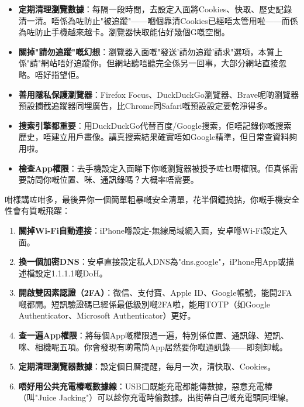 \begin{itemize}
  \item \textbf{定期清理瀏覽數據}：每隔一段時間，去設定入面將Cookies、快取、歷史記錄清一清。唔係為咗防止"被追蹤"——嗰個靠清Cookies已經唔太管用啦——而係為咗防止手機越來越卡。瀏覽器快取能佔好幾個G嘅空間。
  \item \textbf{關掉"請勿追蹤"嘅幻想}：瀏覽器入面嘅"發送'請勿追蹤'請求"選項，本質上係"請"網站唔好追蹤你。但網站聽唔聽完全係另一回事，大部分網站直接忽略。唔好指望佢。
  \item \textbf{善用隱私保護瀏覽器}：Firefox Focus、DuckDuckGo瀏覽器、Brave呢啲瀏覽器預設攔截追蹤器同埋廣告，比Chrome同Safari嘅預設設定要乾淨得多。
  \item \textbf{搜索引擎都重要}：用DuckDuckGo代替百度/Google搜索，佢唔記錄你嘅搜索歷史，唔建立用戶畫像。講真搜索結果確實唔如Google精準，但日常查資料夠用啦。
  \item \textbf{檢查App權限}：去手機設定入面睇下你嘅瀏覽器被授予咗乜嘢權限。佢真係需要訪問你嘅位置、咪、通訊錄嗎？大概率唔需要。
\end{itemize}


咁樣講咗咁多，最後畀你一個簡單粗暴嘅安全清單，花半個鐘搞掂，你嘅手機安全性會有質嘅飛躍：

\begin{enumerate}
  \item \textbf{關掉Wi-Fi自動連接}：iPhone喺設定-無線局域網入面，安卓喺Wi-Fi設定入面。
  \item \textbf{換一個加密DNS}：安卓直接設定私人DNS為"dns.google"，iPhone用App或描述檔設定1.1.1.1嘅DoH。
  \item \textbf{開啟雙因素認證（2FA）}：微信、支付寶、Apple ID、Google帳號，能開2FA嘅都開。短訊驗證碼已經係最低級別嘅2FA啦，能用TOTP（如Google Authenticator、Microsoft Authenticator）更好。
  \item \textbf{查一遍App權限}：將每個App嘅權限過一遍，特別係位置、通訊錄、短訊、咪、相機呢五項。你會發現有啲電筒App居然要你嘅通訊錄——即刻卸載。
  \item \textbf{定期清理瀏覽器數據}：設定個日曆提醒，每月一次，清快取、Cookies。
  \item \textbf{唔好用公共充電樁嘅數據線}：USB口既能充電都能傳數據，惡意充電樁（叫"Juice Jacking"）可以趁你充電時偷數據。出街帶自己嘅充電頭同埋線。
\end{enumerate}

